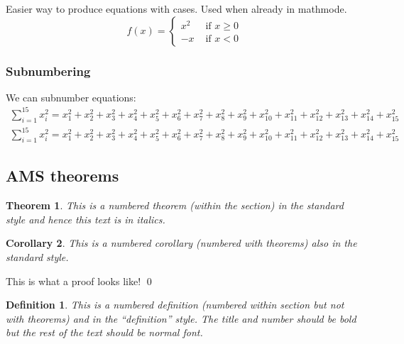 \documentclass[12pt,a4paper]{article}
\theoremstyle{clearprint}
\newenvironment{Proof}
{\noindent{\bf Proof.}\hspace*{1em}}%
{\qed\par}%
\newtheorem{theorem}{Theorem}[section]
\newtheorem{corollary}[theorem]{Corollary}
\newtheorem{definition}{Definition}[section]
\begin{document}
Easier way to produce equations with cases. Used when already in mathmode. 
\begin{equation*}
f(x) = \begin{cases} x^2 & \text{ if } x\geq0\\
-x & \text{ if } x<0 \end{cases}
\end{equation*}

\subsubsection[Subnumbering]{Subnumbering}

\noindent
We can subnumber equations:
\begin{subequations}
\begin{gather}
\sum_{i=1}^{15} x_i^2 = x_1^2 + x_2^2 + x_3^2 + x_4^2 + x_5^2 + x_6^2 + x_7^2 + x_8^2 + x_9^2 + x_{10}^2 + x_{11}^2 + x_{12}^2 + x_{13}^2 + x_{14}^2 + x_{15}^2 \\
\sum_{i=1}^{15} x_i^2 = x_1^2 + x_2^2 + x_3^2 + x_4^2 + x_5^2 + x_6^2 + x_7^2 + x_8^2 + x_9^2 + x_{10}^2 + x_{11}^2 + x_{12}^2 + x_{13}^2 + x_{14}^2 + x_{15}^2 
\end{gather}
\end{subequations}

\subsection[AMS theorems]{AMS theorems}
\setcounter{equation}{0}

\begin{theorem}
This is a numbered theorem (within the section) in the standard style and hence this text is in italics. 
\end{theorem}

\begin{corollary}
This is a numbered corollary (numbered with theorems) also in the standard style.
\end{corollary}

\begin{Proof}
This is what a proof looks like! 
\end{Proof}

\begin{definition}
This is a numbered definition (numbered within section but not with theorems) and in the ``definition'' style. The title and number should be bold but the rest of the text should be normal font.
\end{definition}
\end{document}

